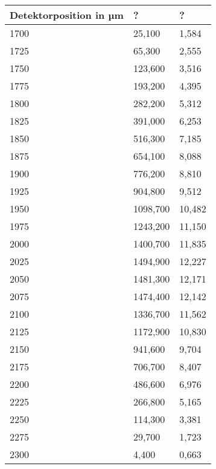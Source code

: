 \documentclass[bigchapter,colorback,accentcolor=tud4b,linedtoc,11pt]{tudreport}
\begin{document}
\begin{center}
  \begin{tabular}{|p{4cm}|p{4cm}|p{4cm}|}
    \hline
    Detektorposition in µm & ?        & ?      \\ \hline
    1700                   &   25,100 &  1,584 \\ \hline
    1725                   &   65,300 &  2,555 \\ \hline
    1750                   &  123,600 &  3,516 \\ \hline
    1775                   &  193,200 &  4,395 \\ \hline
    1800                   &  282,200 &  5,312 \\ \hline
    1825                   &  391,000 &  6,253 \\ \hline
    1850                   &  516,300 &  7,185 \\ \hline
    1875                   &  654,100 &  8,088 \\ \hline
    1900                   &  776,200 &  8,810 \\ \hline
    1925                   &  904,800 &  9,512 \\ \hline
    1950                   & 1098,700 & 10,482 \\ \hline
    1975                   & 1243,200 & 11,150 \\ \hline
    2000                   & 1400,700 & 11,835 \\ \hline
    2025                   & 1494,900 & 12,227 \\ \hline
    2050                   & 1481,300 & 12,171 \\ \hline
    2075                   & 1474,400 & 12,142 \\ \hline
    2100                   & 1336,700 & 11,562 \\ \hline
    2125                   & 1172,900 & 10,830 \\ \hline
    2150                   &  941,600 &  9,704 \\ \hline
    2175                   &  706,700 &  8,407 \\ \hline
    2200                   &  486,600 &  6,976 \\ \hline
    2225                   &  266,800 &  5,165 \\ \hline
    2250                   &  114,300 &  3,381 \\ \hline
    2275                   &   29,700 &  1,723 \\ \hline
    2300                   &    4,400 &  0,663 \\ \hline
	\end{tabular}
\end{center}
\end{document}
